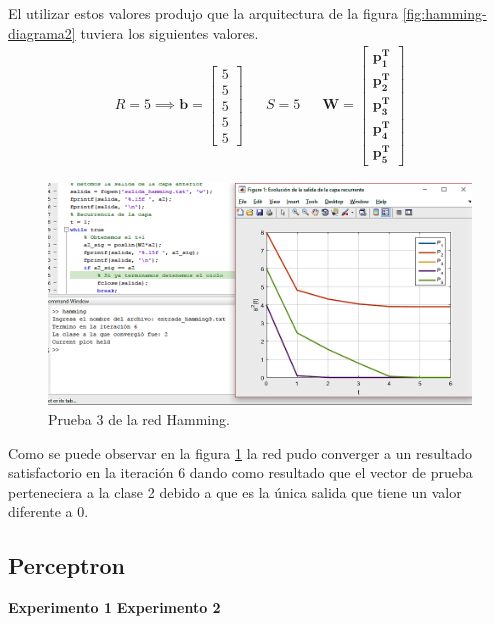 \documentclass[12pt, titlepage]{article}
\begin{document}
        El utilizar estos valores produjo que la arquitectura de la figura \ref{fig:hamming-diagrama2} tuviera los siguientes valores.
        \begin{align*}
        R = 5 \implies \boldsymbol{b} = \left[\begin{array}{c}5 \\5 \\ 5 \\ 5 \\ 5\end{array}\right] && S = 5 && \boldsymbol{W} = \left[\begin{array}{c}\boldsymbol{p^{T}_1}\\ \boldsymbol{p^{T}_2} \\ \boldsymbol{p^{T}_3} \\ \boldsymbol{p^{T}_4} \\ \boldsymbol{p^{T}_5}\end{array}\right]
        \end{align*}
            \begin{figure}[H]
                \begin{center}
                    \includegraphics[width=16cm]{img/hamming/hamming3.png}
                    \caption{Prueba 3 de la red Hamming.}
                    \label{fig:hamming3}
                \end{center}
            \end{figure}
        Como se puede observar en la figura \ref{fig:hamming3} la red pudo converger a un resultado satisfactorio en la iteración 6 dando como resultado que el vector de prueba perteneciera a la clase 2 debido a que es la única salida que tiene un valor diferente a 0.
        \newpage
        \subsection{Perceptron}
        \textbf{Experimento 1}
        \textbf{Experimento 2}
\end{document}

